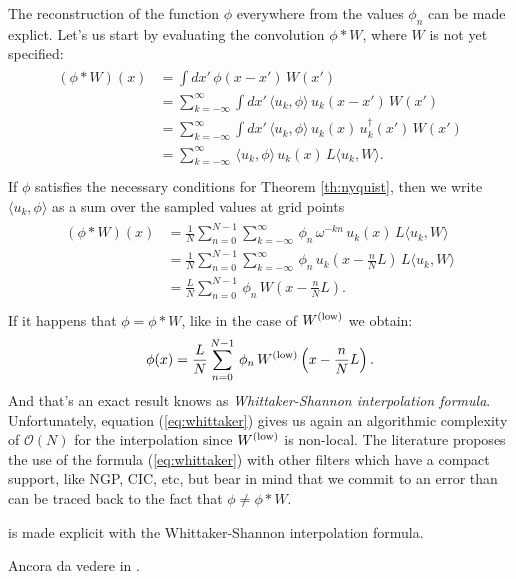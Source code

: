 The reconstruction of the function $\phi$ everywhere
from the values $\phi_n$ can be made explict.
Let's us start by evaluating the convolution $\phi * W$,
where $W$ is not yet specified:
\begin{align}
    \begin{split}
        \left( \phi* W \right)(x) 
            &= \int dx'\, \phi(x-x')\, W(x') \\
            &= \sum_{k=-\infty}^{\infty}\int dx'\,\langle u_k,\phi\rangle\,u_k(x-x')\, W(x')\\
            &= \sum_{k=-\infty}^{\infty}\int dx'\,\langle u_k,\phi\rangle\,
                u_k(x)\,u_k^{\dagger}(x')\, W(x') \\
            &= \sum_{k=-\infty}^{\infty} \,\langle u_k,\phi\rangle\,
                u_k(x)\, L\langle u_k, W\rangle. \\
    \end{split}
\end{align}
If $\phi$ satisfies the necessary conditions
for Theorem \ref{th:nyquist}, then 
we write $\langle u_k,\phi\rangle$ as a sum over the sampled values
at grid points
\begin{align}
    \begin{split}
        \left( \phi* W \right)(x) 
            &=\frac{1}{N} \sum_{n=0}^{N-1} \sum_{k=-\infty}^{\infty} \,
                \phi_n\, \omega^{-kn} \,
                u_k(x)\, L\langle u_k, W\rangle \\
            &=\frac{1}{N} \sum_{n=0}^{N-1} \sum_{k=-\infty}^{\infty} \,
                \phi_n\,
                u_k\left(x-\frac{n}{N}L\right)\, L\langle u_k, W\rangle \\
            &=\frac{L}{N} \sum_{n=0}^{N-1} \,
                \phi_n\,
                 W\left(x-\frac{n}{N}L\right). \\
    \end{split}
\end{align}
If it happens that $\phi = \phi* W$, like in the case of $W^\mathrm{(low)}$ we
obtain:
\begin{equation}
    \phi(x) = 
            \frac{L}{N} \sum_{n=0}^{N-1} \,
                \phi_n\,
                 W^\mathrm{(low)}\left(x-\frac{n}{N}L\right).
   \label{eq:whittaker}
\end{equation}
And that's an exact result knows as \emph{Whittaker-Shannon interpolation formula}.
Unfortunately, equation (\ref{eq:whittaker}) gives us again 
an algorithmic complexity of $\mathcal{O}(N)$ for the interpolation
since $W^\mathrm{(low)}$ is non-local.
The literature \cite{hockney} proposes the use of the formula (\ref{eq:whittaker})
with other filters which have a compact support, like NGP, CIC, etc,
but bear in mind that we commit to an error than can be traced
back to the fact that $\phi \ne \phi * W$.

is made explicit
with the Whittaker-Shannon interpolation formula.



\noindent Ancora da vedere in \cite{hockney}.
